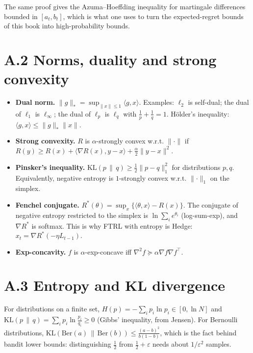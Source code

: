 \documentclass[11pt,a4paper,openany]{book}
\newcommand{\eps}{\varepsilon}
\newcommand{\KL}{\mathrm{KL}}
\newcommand{\ip}[2]{\langle #1,#2\rangle}
\newcommand{\norm}[1]{\lVert #1\rVert}
\begin{document}
The same proof gives the Azuma–Hoeffding inequality for martingale differences bounded in $[a_t,b_t]$, which is what one uses to turn the expected-regret bounds of this book into high-probability bounds.

\section*{A.2 Norms, duality and strong convexity}\label{appA-convex}

\begin{itemize}
\item \textbf{Dual norm.} $\norm{g}_*=\sup_{\norm x\le1}\ip gx$. Examples: $\ell_2$ is self-dual; the dual of $\ell_1$ is $\ell_\infty$; the dual of $\ell_p$ is $\ell_q$ with $\frac1p+\frac1q=1$. Hölder's inequality: $\ip gx\le\norm g_*\norm x$.
\item \textbf{Strong convexity.} $R$ is $\alpha$-strongly convex w.r.t. $\norm\cdot$ if $R(y)\ge R(x)+\ip{\nabla R(x)}{y-x}+\frac\alpha2\norm{y-x}^2$.
\item \textbf{Pinsker's inequality.} $\KL(p\,\|\,q)\ge\frac12\norm{p-q}_1^2$ for distributions $p,q$. Equivalently, negative entropy is $1$-strongly convex w.r.t. $\norm\cdot_1$ on the simplex.
\item \textbf{Fenchel conjugate.} $R^*(\theta)=\sup_x\{\ip\theta x-R(x)\}$. The conjugate of negative entropy restricted to the simplex is $\ln\sum_ie^{\theta_i}$ (log-sum-exp), and $\nabla R^*$ is softmax. This is why FTRL with entropy is Hedge: $x_t=\nabla R^*(-\eta L_{t-1})$.
\item \textbf{Exp-concavity.} $f$ is $\alpha$-exp-concave iff $\nabla^2f\succeq\alpha\nabla f\nabla f^\top$.
\end{itemize}

\section*{A.3 Entropy and KL divergence}\label{appA-kl}

For distributions on a finite set, $H(p)=-\sum_ip_i\ln p_i\in[0,\ln N]$ and $\KL(p\,\|\,q)=\sum_ip_i\ln\frac{p_i}{q_i}\ge0$ (Gibbs' inequality, from Jensen). For Bernoulli distributions, $\KL(\mathrm{Ber}(a)\,\|\,\mathrm{Ber}(b))\le\frac{(a-b)^2}{b(1-b)}$, which is the fact behind bandit lower bounds: distinguishing $\tfrac12$ from $\tfrac12+\eps$ needs about $1/\eps^2$ samples.
\end{document}
